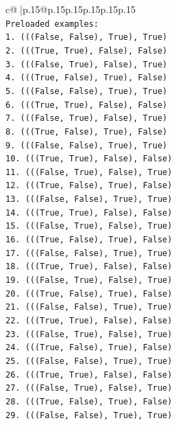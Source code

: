 \documentclass{article}
\begin{document}
{\begin{supertabular}{c@{$\;$}|p{.15\linewidth}@{}p{.15\linewidth}p{.15\linewidth}p{.15\linewidth}p{.15\linewidth}p{.15\linewidth}}
{{{\\ 
\texttt{Preloaded examples:} \\
\texttt{1. (((False, False), True), True)} \\
\texttt{2. (((True, True), False), False)} \\
\texttt{3. (((False, True), False), True)} \\
\texttt{4. (((True, False), True), False)} \\
\texttt{5. (((False, False), True), True)} \\
\texttt{6. (((True, True), False), False)} \\
\texttt{7. (((False, True), False), True)} \\
\texttt{8. (((True, False), True), False)} \\
\texttt{9. (((False, False), True), True)} \\
\texttt{10. (((True, True), False), False)} \\
\texttt{11. (((False, True), False), True)} \\
\texttt{12. (((True, False), True), False)} \\
\texttt{13. (((False, False), True), True)} \\
\texttt{14. (((True, True), False), False)} \\
\texttt{15. (((False, True), False), True)} \\
\texttt{16. (((True, False), True), False)} \\
\texttt{17. (((False, False), True), True)} \\
\texttt{18. (((True, True), False), False)} \\
\texttt{19. (((False, True), False), True)} \\
\texttt{20. (((True, False), True), False)} \\
\texttt{21. (((False, False), True), True)} \\
\texttt{22. (((True, True), False), False)} \\
\texttt{23. (((False, True), False), True)} \\
\texttt{24. (((True, False), True), False)} \\
\texttt{25. (((False, False), True), True)} \\
\texttt{26. (((True, True), False), False)} \\
\texttt{27. (((False, True), False), True)} \\
\texttt{28. (((True, False), True), False)} \\
\texttt{29. (((False, False), True), True)} \\
}}}
\end{supertabular}}
\end{document}
